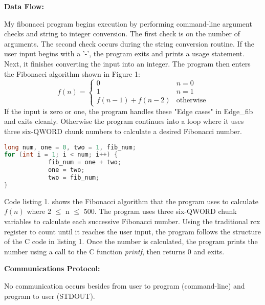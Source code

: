 \documentclass{article}
\begin{document}
\begin{flushleft}
\textbf{Data Flow:}
\vspace{.5pc}
\end{flushleft}

My fibonacci program begins execution by performing command-line argument 
checks and string to integer conversion.  The first check is on the number of 
arguments.  The second check occurs during the string conversion routine.  If 
the user input begins with a '-', the program exits and prints a usage 
statement.  Next, it finishes converting the input into an integer. The 
program then enters the Fibonacci algorithm shown in Figure 1:
\begin{equation}
    f(n) = \begin{cases}
               0               & n = 0\\
               1               & n = 1\\
               f(n-1) + f(n-2) & \text{otherwise}
           \end{cases}
\end{equation}
If the input is zero or one, the program handles these "Edge cases" in
Edge\_fib and exits cleanly.  Otherwise the program continues into a loop 
where it uses three six-QWORD chunk numbers to calculate a desired Fibonacci
number.

\begin{lstlisting}[language=C, caption=Fibonacci in C]
long num, one = 0, two = 1, fib_num;
for (int i = 1; i < num; i++) {
            fib_num = one + two;
            one = two;
            two = fib_num;
}
\end{lstlisting}
Code listing 1. shows the Fibonacci algorithm that the program uses to calculate 
$f(n)$ where 2 $\leq$ n $\leq$ 500.  The program uses three six-QWORD chunk 
variables to calculate each successive Fibonacci number.  Using the 
traditional rcx register to count until it reaches the user input, the program
follows the structure of the C code in listing 1.  Once the number is 
calculated, the program prints the number using a call to the C function 
\textit{printf}, then returns 0 and exits. 
\vspace{.5pc}

\begin{flushleft}
\textbf{Communications Protocol:}
\vspace{.5pc}
\end{flushleft}
No communication occurs besides from user to program (command-line) and 
program to user (STDOUT).
\vspace{.5pc}
\end{document}
